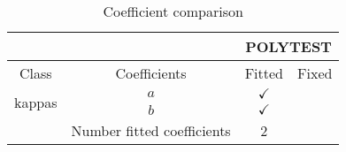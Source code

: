 \documentclass{article}
\begin{document}
\begin{table}[H]
\centering
\begin{tabular}{|c|c|c|c|}
\hline
 &  & \multicolumn{2}{c|}{POLYTEST} \\ \hline
Class & Coefficients & Fitted & Fixed  \\ \hline
\multirow{2}{*}{kappas}
 & $a$ & $\checkmark$ & \\ \cline{2-4}
 & $b$ & $\checkmark$ & 
\\ \hline
\hline & Number fitted coefficients & 2 &  \\ \hline
\end{tabular}
\caption{Coefficient comparison}
\end{table}
\end{document}
